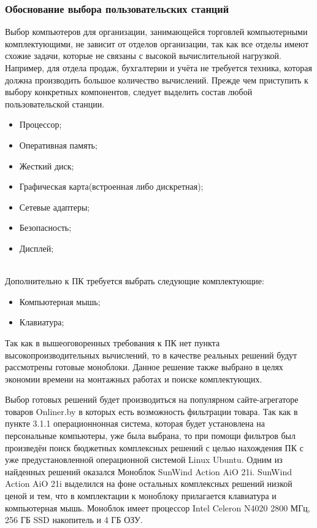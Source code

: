 \subsubsection{Обоснование выбора пользовательских станций}\label{subsubsec:func:PCChoice}
    Выбор компьютеров для организации, занимающейся торговлей компьютерными комплектующими,
    не зависит от отделов организации, так как все отделы имеют схожие задачи,
    которые не связаны с высокой вычислительной нагрузкой.
    Например, для отдела продаж, бухгалтерии и учёта не требуется техника, которая должна производить большое количество вычислений.
    Прежде чем приступить к выбору конкретных компонентов, следует выделить состав любой пользовательской станции.

    \begin{itemize}
        \item Процессор;
        \item Оперативная память;
        \item Жесткий диск;
        \item Графическая карта(встроенная либо дискретная);
        \item Сетевые адаптеры;
        \item Безопасность;
        \item Дисплей;
    \end{itemize} \\

    Дополнительно к ПК требуется выбрать следующие комплектующие:

    \begin{itemize}
        \item Компьютерная мышь;
        \item Клавиатура;
    \end{itemize}


    Так как в вышеоговоренных требования к ПК нет пункта высокопроизводительных вычислений, то в качестве реальных решений будут рассмотрены готовые моноблоки.
    Данное решение также выбрано в целях экономии времени на монтажных работах и поиске комплектующих.

    Выбор готовых решений будет производиться на популярном сайте-агрегаторе товаров Onliner.by в которых есть возможность фильтрации товара.
    Так как в пункте 3.1.1 операционнонная система, которая будет установлена на персональные компьютеры, уже была выбрана,
    то при помощи фильтров был произведён поиск бюджетных комплексных решений с целью нахождения ПК с уже предустановленной операционной системой Linux Ubuntu.
    Одним из найденных решений оказался Моноблок SunWind Action AiO 21i.
    SunWind Action AiO 21i выделился на фоне остальных комплексных решений низкой ценой и тем, что в комплектации к моноблоку прилагается клавиатура и компьютерная мышь.
    Моноблок имеет процессор Intel Celeron N4020 2800 МГц, 256 ГБ SSD накопитель и 4 ГБ ОЗУ.

